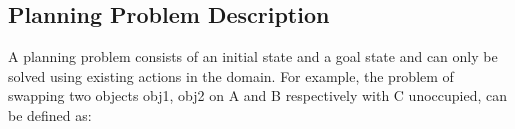 

\subsection{Planning Problem Description}\label{subsec:PPDescription}
A planning problem consists of an initial state and a goal state and can only be solved using existing actions in the domain.
For example, the problem of swapping two objects obj1, obj2 on A and B respectively with C unoccupied, can be defined as:

